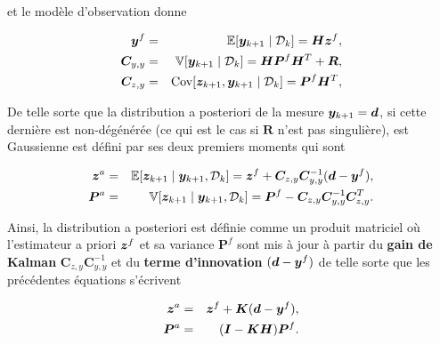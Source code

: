 et le modèle d'observation donne

\begin{eqnarray*}
    \bm{y}^f &=& \mathbb{E} [\bm y_{k+1} \mid \mathcal D_k] = \bm H \bm z^f,\\
    \bm C_{y,y}&=&\mathbb{V} [\bm y_{k+1} \mid \mathcal D_k] = \bm H \bm  P^f \bm H^T + \bm R, \\
    \bm C_{z,y} &=& \text{Cov}[\bm z_{k+1}, \bm y_{k+1}\mid \mathcal D_k] =\bm  P^f \bm H^T,
\end{eqnarray*}

De telle sorte que la distribution a posteriori de la mesure $\bm{y}_{k+1} = \bm d$, si cette dernière est non-dégénérée (ce qui est le cas si $\bm R$ n'est pas singulière), est Gaussienne est défini par ses deux premiers moments qui sont

\begin{eqnarray*}
    \bm z^a &=& \mathbb{E}[\bm z_{k+1} \mid \bm y_{k+1},\mathcal D_k] = \bm z^f + \bm C_{z,y} \bm C_{y,y}^{-1} (\bm d - \bm{y}^f), \\
    \bm  P^a &=& \mathbb{V}[\bm z_{k+1} \mid \bm y_{k+1},\mathcal D_k] = \bm  P^f - \bm C_{z,y} \bm C_{y,y}^{-1} \bm C_{z,y}^T.
\end{eqnarray*}

Ainsi, la distribution a posteriori est définie comme un produit matriciel où l'estimateur a priori $\bm z^f$ et sa variance $\bm  P^f$ sont mis à jour à partir du \textbf{gain de Kalman} $\bm C_{z,y} \bm C_{y,y}^{-1}$ et du \textbf{terme d'innovation} $(\bm{d} - \bm{y}^f)$ de telle sorte que les précédentes équations s'écrivent

\begin{eqnarray*}
    \bm z^a &=& \bm z^f + \bm K (\bm{d} - \bm{y}^f), \\
    \bm  P^a &=& (\bm I - \bm K\bm H)\bm  P^f. \\
\end{eqnarray*}


